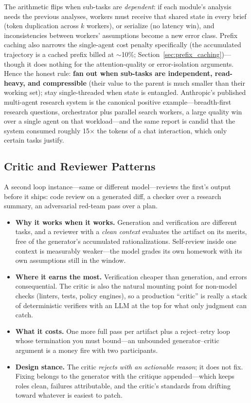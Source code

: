 The arithmetic flips when sub-tasks are \textit{dependent}: if each module's analysis needs the previous analyses, workers must receive that shared state in every brief (token duplication across $k$ workers), or serialize (no latency win), and inconsistencies between workers' assumptions become a new error class. Prefix caching also narrows the single-agent cost penalty specifically (the accumulated trajectory is a cached prefix billed at $\sim$10\%; Section~\ref{sec:prefix_caching})---though it does nothing for the attention-quality or error-isolation arguments. Hence the honest rule: \textbf{fan out when sub-tasks are independent, read-heavy, and compressible} (their value to the parent is much smaller than their working set); stay single-threaded when state is entangled. Anthropic's published multi-agent research system is the canonical positive example---breadth-first research questions, orchestrator plus parallel search workers, a large quality win over a single agent on that workload---and the same report is candid that the system consumed roughly 15$\times$ the tokens of a chat interaction, which only certain tasks justify.

\subsection{Critic and Reviewer Patterns}

A second loop instance---same or different model---reviews the first's output before it ships: code review on a generated diff, a checker over a research summary, an adversarial red-team pass over a plan.

\begin{itemize}
    \item \textbf{Why it works when it works.} Generation and verification are different tasks, and a reviewer with a \textit{clean context} evaluates the artifact on its merits, free of the generator's accumulated rationalizations. Self-review inside one context is measurably weaker---the model grades its own homework with its own assumptions still in the window.
    \item \textbf{Where it earns the most.} Verification cheaper than generation, and errors consequential. The critic is also the natural mounting point for non-model checks (linters, tests, policy engines), so a production ``critic'' is really a stack of deterministic verifiers with an LLM at the top for what only judgment can catch.
    \item \textbf{What it costs.} One more full pass per artifact plus a reject--retry loop whose termination you must bound---an unbounded generator--critic argument is a money fire with two participants.
    \item \textbf{Design stance.} The critic \textit{rejects with an actionable reason}; it does not fix. Fixing belongs to the generator with the critique appended---which keeps roles clean, failures attributable, and the critic's standards from drifting toward whatever is easiest to patch.
\end{itemize}

